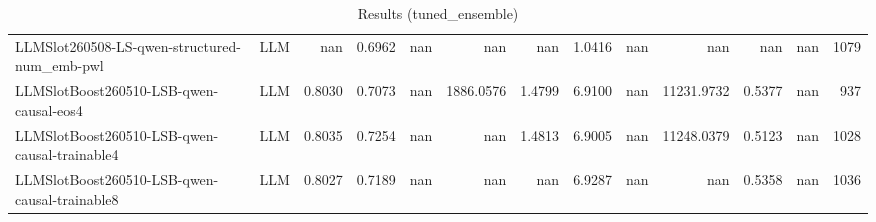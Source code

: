 \begin{table}[htbp]
{\begin{tabular}{ll|rrrrrrrrrr|r}
LLMSlot260508-LS-qwen-structured-num\_emb-pwl & LLM & nan & 0.6962 & nan & nan & nan & 1.0416 & nan & nan & nan & nan & 1079 \\
LLMSlotBoost260510-LSB-qwen-causal-eos4 & LLM & 0.8030 & 0.7073 & nan & 1886.0576 & 1.4799 & 6.9100 & nan & 11231.9732 & 0.5377 & nan & 937 \\
LLMSlotBoost260510-LSB-qwen-causal-trainable4 & LLM & 0.8035 & 0.7254 & nan & nan & 1.4813 & 6.9005 & nan & 11248.0379 & 0.5123 & nan & 1028 \\
LLMSlotBoost260510-LSB-qwen-causal-trainable8 & LLM & 0.8027 & 0.7189 & nan & nan & nan & 6.9287 & nan & nan & 0.5358 & nan & 1036 \\
\bottomrule
\end{tabular}
}
\caption{Results (tuned_ensemble)}
\label{tab:results_tuned_ensemble}
\end{table}